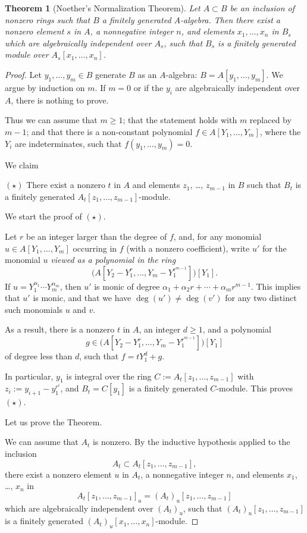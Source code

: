 \documentclass[12pt,letterpaper]{article}%
\newcommand{\nn}{\noindent}
\newtheorem{thm}{Theorem}%
\begin{document}
\begin{thm}[Noether's Normalization Theorem]\label{thmnnt}
Let $A\subset B$ be an inclusion of nonzero rings such that $B$ a finitely generated $A$-algebra. Then there exist a nonzero element $s$ in $A$, a nonnegative integer $n$, and elements $x_1,\dots,x_n$ in $B_s$ which are algebraically independent over $A_s$, such that $B_s$ is a finitely generated module over $A_s[x_1,\dots,x_n]$. 
\end{thm}
\begin{proof} 
Let $y_1,\dots,y_m\in B$ generate $B$ as an $A$-algebra: $B=A[y_1,\dots,y_m]$. We argue by induction on $m$. If $m=0$ or if the $y_i$ are algebraically independent over $A$, there is nothing to prove.

Thus we can assume that $m\ge1$; that the statement holds with $m$ replaced by $m-1$; and that there is a non-constant polynomial $f\in A[Y_1,\dots,Y_m]$, where the $Y_i$ are indeterminates, such that $f(y_1,\dots,y_m)=0$. 

We claim 

\nn$(\star)$ There exist a nonzero $t$ in $A$ and elements $z_1$, \dots, $z_{m-1}$ in $B$ such that $B_t$ is a finitely generated $A_t[z_1,\dots,z_{m-1}]$-module. 

We start the proof of $(\star)$. 

Let $r$ be an integer larger than the degree of $f$, and, for any monomial $u\in A[Y_1,\dots,Y_m]$ occurring in $f$ (with a nonzero coefficient), write $u'$ for the monomial $u$ \emph{viewed as a polynomial in the ring} 
$$
\bigg(A\left[Y_2-Y_1^r,\dots,Y_m-Y_1^{r^{m-1}}\right]\bigg)[Y_1].
$$ 
If $u=Y_1^{\alpha_1}\cdots Y_m^{\alpha_m}$, then $u'$ is monic of degree $\alpha_1+\alpha_2r+\cdots+\alpha_mr^{m-1}$. This implies that $u'$ is monic, and that we have $\deg(u')\ne\deg(v')$ for any two distinct such monomials $u$ and $v$. 

As a result, there is a nonzero $t$ in $A$, an integer $d\ge1$, and a polynomial 
$$
g\in\bigg(A\left[Y_2-Y_1^r,\dots,Y_m-Y_1^{r^{m-1}}\right]\bigg)[Y_1]
$$ 
of degree less than $d$, such that $f=tY_1^d+g$. 

In particular, $y_1$ is integral over the ring $C:=A_t[z_1,\dots,z_{m-1}]$ with $z_i:=y_{i+1}-y_1^{r^i}$, and $B_t=C[y_1]$ is a finitely generated $C$-module. This proves $(\star)$.

Let us prove the Theorem.

We can assume that $A_t$ is nonzero. By the inductive hypothesis applied to the inclusion 
$$
A_t\subset A_t[z_1,\dots,z_{m-1}],
$$ 
there exist a nonzero element $u$ in $A_t$, a nonnegative integer $n$, and elements $x_1$, \dots, $x_n$ in 
$$
A_t[z_1,\dots,z_{m-1}]_u=(A_t)_u[z_1,\dots,z_{m-1}]
$$ 
which are algebraically independent over $(A_t)_u$, such that $(A_t)_u[z_1,\dots,z_{m-1}]
$ is a finitely generated $(A_t)_u[x_1,\dots,x_n]$-module. 


\end{proof}
\end{document}
